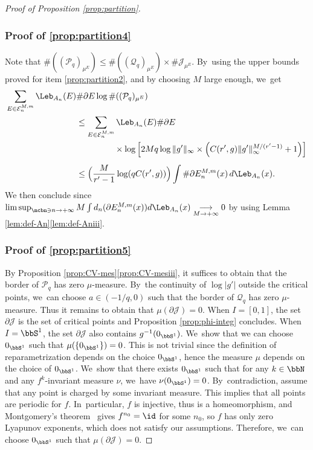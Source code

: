 \begin{proof}[Proof of Proposition \ref{prop:partition}]
\subsubsection*{Proof of \eqref{prop:partition4}}
Note that $\# ((\mathcal{P}_q)_{\mu^E}) \leq \# ((\mathcal{Q}_q)_{\mu^E}) \times \# \mathcal{J}_{\mu^E}$. By~using the upper bounds proved for item \eqref{prop:partition2}, and by choosing $M$ large enough, we~get
\begin{align*}
\sum_{E \in \mathcal{E}_n^{M,m}} \Leb_{A_n}(E) &\# \partial E \log \# ((\mathcal{P}_q)_{\mu^E}) \\
&\leq \sum_{E \in \mathcal{E}_n^{M,m}} \Leb_{A_n}(E) \# \partial E\\
&\hspace{4.5em} {}\times\log \left [ 2M q \log \| g' \|_{\infty} \times \left (C(r',g) \| g' \|_{\infty}^{M / (r' - 1)} + 1 \right) \right ]\\[0.5em]
&\leq \Bigl (\frac{M}{r' - 1} \log (q C(r',g)) \Bigr) \int \# \partial E_n^{M,m}(x)\, d\Leb_{A_n}(x).
\end{align*}
We then conclude since $\limsup_{\mcbn \ni n \to +\infty} M \int d_n(\partial E_n^{M,m}(x)) d \Leb_{A_n}(x) \underset{M \to +\infty}{\longrightarrow} 0$ by using Lemma \ref{lem:def-An}\eqref{lem:def-Aniii}.

\subsubsection*{Proof of \eqref{prop:partition5}}
By Proposition \ref{prop:CV-mes}\eqref{prop:CV-mesiii}, it suffices to obtain that the border of $\mathcal{P}_q$ has zero $\mu$-measure. By~the continuity of $\log |g'|$ outside the critical points, we~can choose $a \in (- 1 /q, 0)$ such that the border of $\mathcal{Q}_q$ has zero $\mu$-measure.
Thus it remains to obtain that $\mu (\partial \mathcal{J}) = 0$.
When $I = [0,1]$, the set $\partial \mathcal{J}$ is the set of critical points and Proposition \ref{prop:phi-integ} concludes.
When $I = \bbS^1$, the set $\partial \mathcal{J}$ also contains $g^{-1}(0_{\bbS^1})$. We~show that we can choose $0_{\bbS^1}$ such that $\mu(\{ 0_{\bbS^1} \}) = 0$.
This is not trivial since the definition of reparametrization depends on the choice $0_{\bbS^1}$, hence the measure $\mu$ depends on the choice of $0_{\bbS^1}$. We~show that there exists $0_{\bbS^1}$ such that for any $k \in \bbN$ and any $f^k$-invariant measure $\nu$, we~have $\nu(0_{\bbS^1}) = 0$. By~contradiction, assume that any point is charged by some invariant measure.
This implies that all points are periodic for $f$. In~particular, $f$ is injective, thus is a homeomorphism, and Montgomery's theorem~\cite{Montgomery} gives $f^{n_0} = \id$ for some $n_0$, so $f$ has only zero Lyapunov exponents, which does not satisfy our assumptions.
Therefore, we~can choose $0_{\bbS^1}$ such that $\mu(\partial \mathcal{J}) = 0$.
\end{proof}

